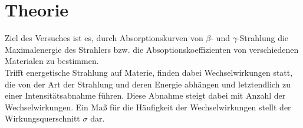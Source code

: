 \section{Theorie}
\label{sec:Theorie}

Ziel des Versuches ist es, durch Absorptionskurven von $\beta$- und $\gamma$-Strahlung 
die Maximalenergie des Strahlers bzw. die Absoptionskoeffizienten von verschiedenen
Materialen zu bestimmen.\\

Trifft energetische Strahlung auf Materie, finden dabei Wechselwirkungen statt, die 
von der Art der Strahlung und deren Energie abhängen und letztendlich zu einer
Intensitätsabnahme führen. Diese Abnahme steigt dabei mit Anzahl der Wechselwirkungen.
Ein Maß für die Häufigkeit der Wechselwirkungen stellt der Wirkungsquerschnitt $\sigma$
dar. 